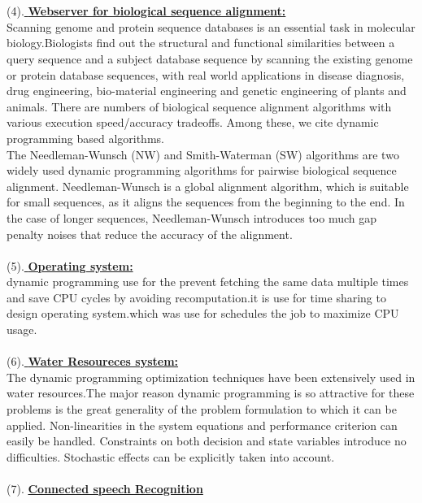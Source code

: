 \documentclass[12pt]{book}
\begin{document}
\\\\
(4).\underline{
\textbf{Webserver for biological sequence alignment:}}\\
Scanning genome and protein sequence databases is an essential task in molecular biology.Biologists find out the structural  and  functional  similarities  between  a  query  sequence and a subject database sequence by scanning the existing  genome  or  protein  database  sequences,  with  real  world applications in disease diagnosis, drug engineering, bio-material engineering and genetic engineering of plants and  animals.  There  are  numbers  of  biological  sequence  alignment       algorithms       with       various       execution       speed/accuracy  tradeoffs.  Among  these,  we  cite  dynamic  programming   based   algorithms.\\
The  Needleman-Wunsch  (NW)  and  Smith-Waterman  (SW)    algorithms    are    two    widely    used    dynamic    programming algorithms for pairwise biological sequence alignment.   Needleman-Wunsch   is   a   global   alignment   algorithm,  which  is  suitable  for  small  sequences,  as  it  aligns the sequences from the beginning to the end. In the case  of  longer  sequences,  Needleman-Wunsch  introduces  too  much  gap  penalty  noises  that  reduce  the  accuracy  of  the  alignment.
\\\\
(5).\underline{
\textbf{Operating system:}}\\
dynamic programming use for the prevent fetching the same data multiple times and save CPU cycles by avoiding recomputation.it is use for time sharing to design operating system.which was use for schedules the job to maximize CPU usage.
\\\\
(6).\underline{
\textbf{Water Resoureces system:}}\\
The dynamic programming optimization techniques have been extensively used in water resources.The major reason dynamic programming is so attractive for these problems is the great generality of the problem formulation to which it can be applied. Non-linearities in the system equations and performance criterion can easily be handled. Constraints on both decision and state variables introduce no difficulties. Stochastic effects can be explicitly taken into account.
\\\\
(7). \underline{
\textbf{Connected speech Recognition}}\\
\end{document}
